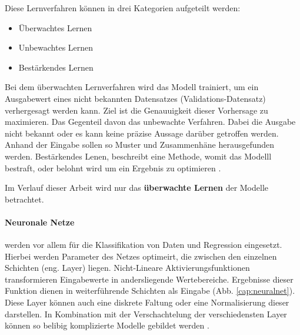 Diese  Lernverfahren können in drei Kategorien aufgeteilt werden:
\begin{itemize}
  \setlength\itemsep{-0.5em}
\item Überwachtes Lernen
\item Unbewachtes Lernen
\item Bestärkendes Lernen
\end{itemize}

Bei dem überwachten Lernverfahren wird das Modell trainiert, um ein Ausgabewert eines nicht bekannten Datensatzes (Validations-Datensatz) verhergesagt werden kann. Ziel ist die Genauuigkeit dieser Vorhersage zu maximieren. Das Gegenteil davon das unbewachte Verfahren. Dabei die Ausgabe nicht bekannt oder es kann keine präzise Aussage darüber getroffen werden. Anhand der Eingabe sollen so Muster und Zusammenhäne herausgefunden werden. Bestärkendes Lenen, beschreibt eine Methode, womit das Modelll bestraft, oder belohnt wird um ein Ergebnis zu optimieren \cite{machinelearning_1}.

Im Verlauf dieser Arbeit wird nur das \textbf{überwachte Lernen} der Modelle betrachtet.


\paragraph{Neuronale Netze} werden vor allem für die Klassifikation von Daten und Regression eingesetzt. Hierbei werden Parameter des Netzes optimeirt, die zwischen den einzelnen Schichten (eng. Layer) liegen. Nicht-Lineare Aktivierungsfunktionen transformieren Eingabewerte in andersliegende Wertebereiche. Ergebnisse dieser Funktion dienen in weiterführende Schichten als Eingabe (Abb. \ref{cap:neuralnet}). Diese Layer können auch eine diskrete Faltung oder eine Normalisierung dieser darstellen. In Kombination mit der Verschachtelung der verschiedensten Layer können so belibig komplizierte Modelle gebildet werden \cite{machinelearning_3}.


